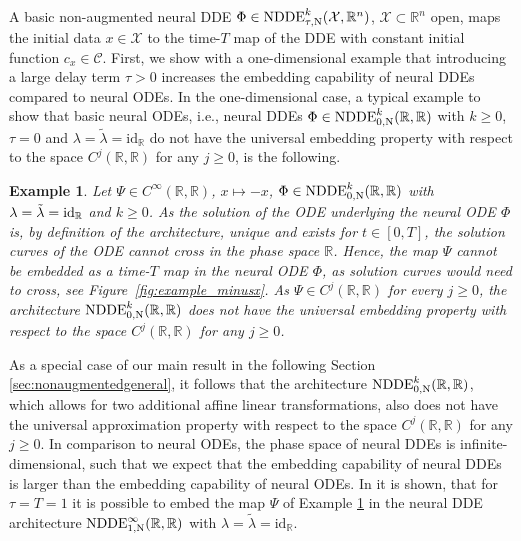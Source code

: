 \documentclass[10pt]{article}
\numberwithin{equation}{section}
\newtheorem{example}[theorem]{Example}
\begin{document}
	A basic non-augmented neural DDE $\Phi\in \textup{NDDE}_{\tau,\textup{N}}^k(\mathcal{X},\mathbb{R}^n)$, $\mathcal{X}\subset \mathbb{R}^n$ open, maps the initial data $x \in \mathcal{X}$ to the time-$T$ map of the DDE with constant initial function $c_x \in \mathcal{C}$. First, we show with a one-dimensional example that introducing a large delay term $\tau>0$ increases the embedding capability of neural DDEs compared to neural ODEs. In the one-dimensional case, a typical example to show that basic neural ODEs, i.e., neural DDEs $\Phi \in \textup{NDDE}_{0,\textup{N}}^k(\mathbb{R},\mathbb{R})$ with $k \geq 0$, $\tau = 0$ and $\lambda = \tilde\lambda = \text{id}_\mathbb{R}$ do not have the universal embedding property with respect to the space $C^j(\mathbb{R},\mathbb{R})$ for any $j \geq 0$, is the following.
	
	\begin{example} \label{ex:minusxembedding_a}
		\normalfont
		Let $\Psi\in C^\infty(\mathbb{R},\mathbb{R})$, $x \mapsto -x$, $\Phi \in \textup{NDDE}_{0,\textup{N}}^k(\mathbb{R},\mathbb{R})$ with  $\lambda = \tilde\lambda = \textup{id}_\mathbb{R}$ and $k \geq 0$. As the solution of the ODE underlying the neural ODE $\Phi$ is, by definition of the architecture, unique and exists for $t \in [0,T]$, the solution curves of the ODE cannot cross in the phase space $\mathbb{R}$. Hence, the map $\Psi$ cannot be embedded as a time-$T$ map in the neural ODE $\Phi$, as solution curves would need to cross, see Figure~\ref{fig:example_minusx}. As $\Psi\in C^j(\mathbb{R},\mathbb{R})$ for every $j \geq 0$, the architecture $ \textup{NDDE}_{0,\textup{N}}^k(\mathbb{R},\mathbb{R})$ does not have the universal embedding property with respect to the space $C^j(\mathbb{R},\mathbb{R})$ for any $j \geq 0$.
	\end{example}
	
	As a special case of our main result in the following Section \ref{sec:nonaugmentedgeneral}, it follows that the architecture $ \textup{NDDE}_{0,\textup{N}}^k(\mathbb{R},\mathbb{R})$, which allows for two additional affine linear transformations, also does not have the universal approximation property with respect to the space $C^j(\mathbb{R},\mathbb{R})$ for any $j \geq 0$. In comparison to neural ODEs, the phase space of neural DDEs is infinite-dimensional, such that we expect that the embedding capability of neural DDEs is larger than the embedding capability of neural ODEs. In \cite{Zhu2021} it is shown, that for $\tau = T = 1$ it is possible to embed the map $\Psi$ of Example \ref{ex:minusxembedding_a} in the neural DDE architecture $\textup{NDDE}_{1,\textup{N}}^\infty(\mathbb{R},\mathbb{R})$ with $\lambda = \tilde\lambda = \text{id}_\mathbb{R}$. 
	
\end{document}
